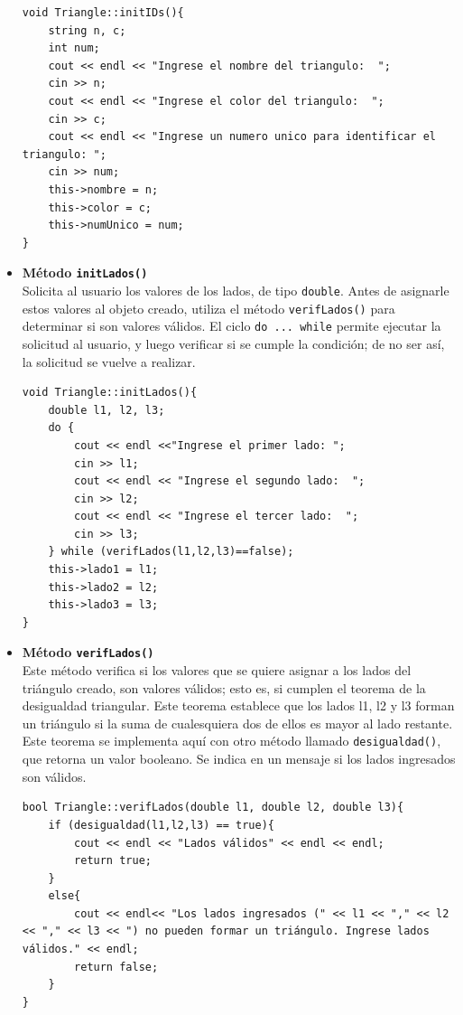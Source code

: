 \begin{itemize}
\begin{verbatim}
void Triangle::initIDs(){
	string n, c;
	int num;
	cout << endl << "Ingrese el nombre del triangulo:  ";
	cin >> n;
	cout << endl << "Ingrese el color del triangulo:  ";
	cin >> c;
	cout << endl << "Ingrese un numero unico para identificar el triangulo: ";
	cin >> num;
	this->nombre = n;
	this->color = c;
	this->numUnico = num;
}
\end{verbatim}

\item \textbf{Método \texttt{initLados()}}\\
Solicita al usuario los valores de los lados, de tipo \texttt{double}. Antes de asignarle estos valores al objeto creado, utiliza el método \texttt{verifLados()} para determinar si son valores válidos. El ciclo \texttt{do ... while} permite ejecutar la solicitud al usuario, y luego verificar si se cumple la condición; de no ser así, la solicitud se vuelve a realizar.

\begin{verbatim}
void Triangle::initLados(){
	double l1, l2, l3;
	do {
		cout << endl <<"Ingrese el primer lado: ";
		cin >> l1;
		cout << endl << "Ingrese el segundo lado:  ";
		cin >> l2;
		cout << endl << "Ingrese el tercer lado:  ";
		cin >> l3;
	} while (verifLados(l1,l2,l3)==false);
	this->lado1 = l1;
	this->lado2 = l2;
	this->lado3 = l3;
}
\end{verbatim}

\item \textbf{Método \texttt{verifLados()}}\\
Este método verifica si los valores que se quiere asignar a los lados del triángulo creado, son valores válidos; esto es, si cumplen el teorema de la desigualdad triangular. Este teorema establece que los lados l1, l2 y l3 forman un triángulo si la suma de cualesquiera dos de ellos es mayor al lado restante. Este teorema se implementa aquí con otro método llamado \texttt{desigualdad()}, que retorna un valor booleano. Se indica en un mensaje si los lados ingresados son válidos.

\begin{verbatim}
bool Triangle::verifLados(double l1, double l2, double l3){
	if (desigualdad(l1,l2,l3) == true){
		cout << endl << "Lados válidos" << endl << endl;
		return true;
	}
	else{
		cout << endl<< "Los lados ingresados (" << l1 << "," << l2 << "," << l3 << ") no pueden formar un triángulo. Ingrese lados válidos." << endl;
		return false;
	}
}


\end{verbatim}
\end{itemize}
